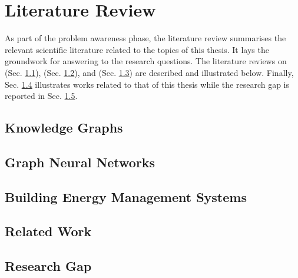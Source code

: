 \chapter{Literature Review}\label{chap:literature-review}
As part of the problem awareness phase, the literature review summarises the relevant scientific literature related to the topics of this thesis.
It lays the groundwork for answering to the research questions.
The literature reviews on  (Sec. \ref{sec:knowledge-graphs}),  (Sec. \ref{sec:graph-neural-networks}), and  (Sec. \ref{sec:building-energy-management-systems}) are described and illustrated below.
Finally, Sec. \ref{sec:related-work} illustrates works related to that of this thesis while the research gap is reported in Sec. \ref{sec:research-gap}.

\section{Knowledge Graphs}\label{sec:knowledge-graphs}

%
\section{Graph Neural Networks}\label{sec:graph-neural-networks}

%
\section{Building Energy Management Systems}\label{sec:building-energy-management-systems}

%
\section{Related Work}\label{sec:related-work}

%
\section{Research Gap}\label{sec:research-gap}

